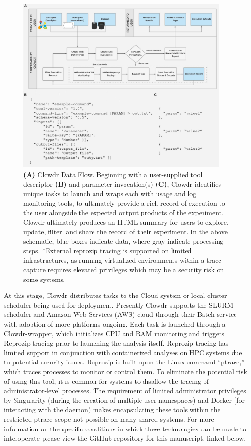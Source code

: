 \documentclass[fleqn,12pt]{SelfArx_ch} %
\begin{document}
\begin{figure}[h!]
\centering
\includegraphics[width=0.95\textwidth]{./figures/fig2.jpg}
\caption{\textbf{(A)} Clowdr Data Flow. Beginning with a user-supplied tool descriptor \textbf{(B)} and parameter
invocation(s) \textbf{(C)}, Clowdr identifies unique tasks to launch and wraps each with usage and log monitoring
tools, to ultimately provide a rich record of execution to the user alongside the expected output products of the
experiment. Clowdr ultimately produces an HTML summary for users to explore, update, filter, and share the record of
their experiment. In the above schematic, blue boxes indicate data, where gray indicate processing steps. *External
reprozip tracing is supported on limited infrastructures, as running virtualized environments within a trace capture
requires elevated privileges which may be a security risk on some systems.}
\label{fig:ch1.2}
\end{figure}

At this stage, Clowdr distributes tasks to the Cloud system or local cluster scheduler being used for deployment.
Presently Clowdr supports the SLURM scheduler and Amazon Web Services (AWS) cloud through their Batch service with
adoption of more platforms ongoing. Each task is launched through a Clowdr-wrapper, which initializes CPU and RAM
monitoring and triggers Reprozip tracing prior to launching the analysis itself. Reprozip tracing has limited support
in conjunction with containerized analyses on HPC systems due to potential security issues. Reprozip is built upon the
Linux command “ptrace,” which traces processes to monitor or control them. To eliminate the potential risk of using
this tool, it is common for systems to disallow the tracing of administrator-level processes. The requirement of
limited administrator privileges by Singularity (during the creation of multiple user namespaces) and Docker (for
interacting with the daemon) makes encapsulating these tools within the restricted ptrace scope not possible on many
shared systems. For more information on the specific conditions in which these technologies can be made to interoperate
please view the GitHub repository for this manuscript, linked below.
\end{document}
